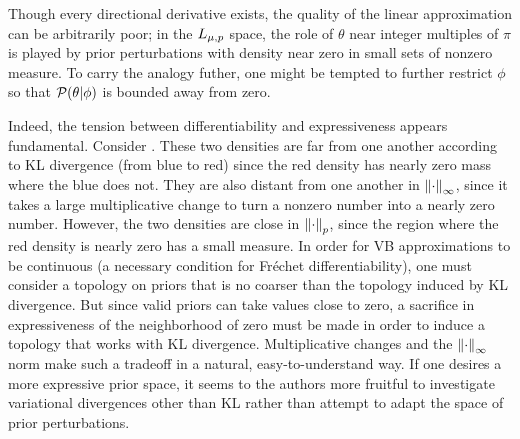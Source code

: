 Though every directional derivative exists, the quality of the linear
approximation can be arbitrarily poor; in the ${L_{\mu,p}}$ space, the role of
$\theta$ near integer multiples of $\pi$ is played by prior perturbations with
density near zero in small sets of nonzero measure.  To carry the analogy
futher, one might be tempted to further restrict $\phi$ so that $\mathcal{P}(\theta \vert
\phi)$ is bounded away from zero.

Indeed, the tension between differentiability and expressiveness appears
fundamental.  Consider .  These two densities are far from one
another according to KL divergence (from blue to red) since the red density has
nearly zero mass where the blue does not.  They are also distant from one
another in $\left\Vert\cdot\right\Vert_{\infty}$, since it takes a large multiplicative change to
turn a nonzero number into a nearly zero number.  However, the two densities are
close in $\left\Vert\cdot\right\Vert_{p}$, since the region where the red density is nearly
zero has a small measure. In order for VB approximations to be continuous (a
necessary condition for Fr{\'e}chet differentiability), one must consider a
topology on priors that is no coarser than the topology induced by KL
divergence.  But since valid priors can take values close to zero, a sacrifice
in expressiveness of the neighborhood of zero must be made in order to induce a
topology that works with KL divergence.  Multiplicative changes and the
$\left\Vert\cdot\right\Vert_{\infty}$ norm make such a tradeoff in a natural, easy-to-understand
way.  If one desires a more expressive prior space, it seems to the authors more
fruitful to investigate variational divergences other than KL rather than
attempt to adapt the space of prior perturbations.

\FunctionDistFig{}
